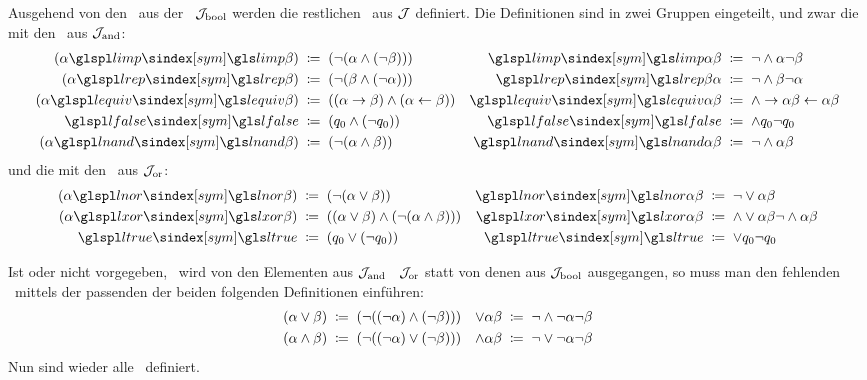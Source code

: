 Ausgehend von den \Junktoren\ aus der \BoolschenSignatur\ $\mathcal{J}_{\mathrm{bool}}$ werden die restlichen \Junktoren\ aus $\mathcal{J}$ definiert.
Die Definitionen sind in zwei Gruppen eingeteilt, und zwar die mit den \Junktoren\ aus $\mathcal{J}_{\mathrm{and}}$:
\begin{align}
	(\alpha \glsSym{limp} \beta) &\;\defeq\; (\lnot (\alpha \land  (\lnot \beta))) &
	\glsSym{limp} \alpha \beta   &\;\defeq\;  \lnot    \land \alpha \lnot \beta
	\label{def:imp}
	\\
	(\alpha \glsSym{lrep} \beta) &\;\defeq\; (\lnot (\beta \land  (\lnot \alpha))) &
	\glsSym{lrep} \beta  \alpha  &\;\defeq\;  \lnot    \land \beta \lnot \alpha
	\label{def:rep}
	\\
	(\alpha \glsSym{lequiv} \beta) &\;\defeq\; ((\alpha \limp \beta) \land (\alpha \lrep \beta)) &
	\glsSym{lequiv} \alpha  \beta  &\;\defeq\; \land \limp \alpha \beta \lrep \alpha \beta
	\label{def:equiv}
	\\
	\glsSym{lfalse}              &\;\defeq\; (\alvar_0 \land (\lnot \alvar_0)) &
	\glsSym{lfalse}              &\;\defeq\;  \land \alvar_0  \lnot \alvar_0   \label{def:false}
	\\
	(\alpha \glsSym{lnand} \beta)&\;\defeq\; (\lnot (\alpha \land \beta )) &
	\glsSym{lnand} \alpha  \beta &\;\defeq\;  \lnot  \land \alpha \beta \label{def:nand}
\end{align}
und die mit den \Junktoren\ aus $\mathcal{J}_{\mathrm{or}}$:
\begin{align}
	(\alpha \glsSym{lnor} \beta) &\;\defeq\; (\lnot (\alpha \lor \beta))   &
	\glsSym{lnor} \alpha  \beta  & \;\defeq\;  \lnot  \lor \alpha \beta \label{def:nor}
	\\
	(\alpha \glsSym{lxor} \beta) & \;\defeq\; ((\alpha \lor \beta) \land (\lnot (\alpha \land \beta)))&
	\glsSym{lxor} \alpha  \beta  & \;\defeq\;  \land \lor\alpha\beta \lnot \land \alpha \beta
	\label{def:add}
	\\
	\glsSym{ltrue} & \;\defeq\; (\alvar_0 \lor (\lnot \alvar_0)) &
	\glsSym{ltrue} & \;\defeq\;  \lor \alvar_0  \lnot \alvar_0
	\label{def:true}
\end{align}

Ist \chrqt{$\lor$} oder \chrqt{$\land$} nicht vorgegeben, \textdh\ wird von den Elementen aus $\mathcal{J}_{\mathrm{and}}$ \textbzgl\ $\mathcal{J}_{\mathrm{or}}$ statt von denen aus $\mathcal{J}_{\mathrm{bool}}$ ausgegangen, so muss man den fehlenden \Junktor\ mittels der passenden der beiden folgenden Definitionen einführen:
\begin{align}
	(\alpha \lor \beta)  & \;\coloneqq\; (\lnot((\lnot\alpha)\land(\lnot\beta))) &
	\lor \alpha  \beta   & \;\coloneqq\;  \lnot \land \lnot \alpha \lnot \beta
	\label{def:orand} \\
	(\alpha \land \beta) & \;\coloneqq\; (\lnot((\lnot\alpha)\lor(\lnot\beta)))  &
	\land \alpha  \beta  & \;\coloneqq\;  \lnot \lor \lnot \alpha \lnot \beta
	\label{def:andor}
\end{align}
Nun sind wieder alle \Junktoren\ definiert.

